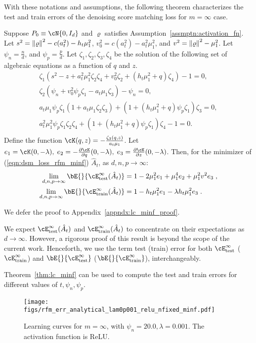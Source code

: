 With these notations and assumptions, the following theorem characterizes the test and train errors of the denoising score matching loss for $m=\infty$ case.
\begin{theorem}\label{thm:lc_minf}
    Suppose $P_0\equiv\cN{0,I_d}$ and $\varrho$ satisfies Assumption~\ref{assmptn:activation_fn}. Let $s^2 = \norm{\varrho}^2-c(a_t^2)-h_t\mu_1^2$,\; $v_0^2=c(a_t^2)-a_t^2\mu_1^2$, and $v^2 = \norm{\varrho}^2-\mu_1^2$. Let $\psi_n = \frac{n}{d}$, and $\psi_p = \frac{p}{d}$. Let $\zeta_1,\zeta_2,\zeta_3,\zeta_4$ be the solution of the following set of algebraic equations as a function of $q$ and $z$.
    \begin{align*}
    \zeta_1(s^2-z+a_t^2\mu_1^2\zeta_2\zeta_4+v_0^2\zeta_2+(h_t\mu_1^2+q)\zeta_4) -1= 0,\nonumber\\
    \zeta_2(\psi_n+v_0^2\psi_p\zeta_1-a_t\mu_1\zeta_3)-\psi_n =0,\nonumber\\
    a_t\mu_1\psi_p\zeta_1(1+a_t\mu_1\zeta_2\zeta_3)+(1+(h_t\mu_1^2+q)\psi_p\zeta_1)\zeta_3 = 0,\nonumber\\
    a_t^2\mu_1^2\psi_p\zeta_1\zeta_2\zeta_4+(1+(h_t\mu_1^2+q)\psi_p\zeta_1)\zeta_4 -1= 0.\nonumber\\
    \end{align*}
    Define the function $\cK(q,z) = -\frac{\zeta_3(q,z)}{a_t\mu_1}$. Let $e_1 = \cK(0,-\lambda),\; e_2 = -\frac{\partial \cK}{\partial q}(0,-\lambda),\; e_3 = \frac{\partial \cK}{\partial z}(0,-\lambda)$. Then, for the minimizer of (\ref{eqn:dsm_loss_rfm_minf}) $\hat{A}_t$, as $d,n,p\to\infty$: 
    \begin{align*}
        \lim_{d,n,p\to\infty}\bE{}{\cE^\infty_{\text{test}}(\hat{A}_t)} &= 1-2\mu_1^2e_1+\mu_1^4e_2+\mu_1^2v^2e_3 \;,\\
    \lim_{d,n,p\to\infty}\bE{}{\cE^\infty_{\text{train}}(\hat{A}_t)} &= 1-h_t\mu_1^2e_1-\lambda h_t\mu_1^2e_3 \;.
    \end{align*}
\end{theorem}
We defer the proof to Appendix~\ref{appndx:lc_minf_proof}. 
\begin{remark}
    We expect $\cE^\infty_{\text{test}}(\hat{A}_t)$ and $\cE^\infty_{\text{train}}(\hat{A}_t)$ to concentrate on their expectations as $d\to\infty$. However, a rigorous proof of this result is beyond the scope of the current work. Henceforth, we use the term test (train) error for both $\cE^\infty_{\text{test}}$ ($\cE^\infty_{\text{train}}$) and $\bE{}{\cE^\infty_{\text{test}}}$ ($\bE{}{\cE^\infty_{\text{train}}}$), interchangeably.
\end{remark}
Theorem~\ref{thm:lc_minf} can be used to compute the test and train errors for different values of $t,\psi_n,\psi_p$.
\begin{figure}[ht]
    \centering
    \texttt{[image: figs/rfm\_err\_analytical\_lam0p001\_relu\_nfixed\_minf.pdf]}
    \caption{Learning curves for $m=\infty$, with $\psi_n=20.0,\lambda=0.001$. The activation function is ReLU.}
    \label{fig:lc_minf_rp}
\end{figure}

